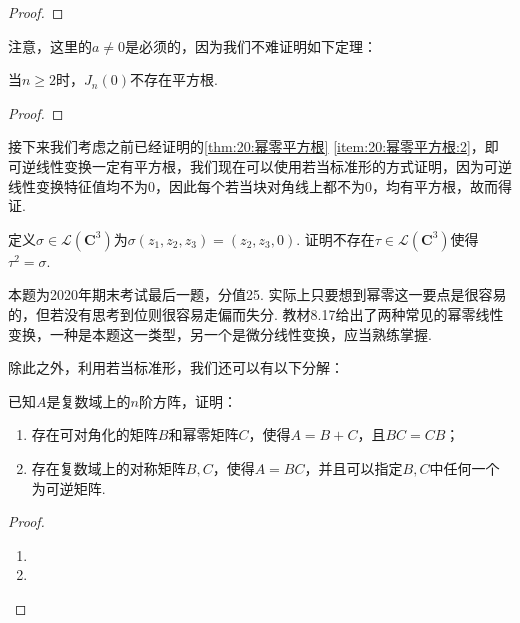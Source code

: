 \begin{proof}

\end{proof}

注意，这里的$a\neq 0$是必须的，因为我们不难证明如下定理：
\begin{theorem}
    当$n\geqslant 2$时，$J_n(0)$不存在平方根.
\end{theorem}

\begin{proof}

\end{proof}

接下来我们考虑之前已经证明的\autoref{thm:20:幂零平方根} \ref*{item:20:幂零平方根:2}，即可逆线性变换一定有平方根，我们现在可以使用若当标准形的方式证明，因为可逆线性变换特征值均不为0，因此每个若当块对角线上都不为0，均有平方根，故而得证.
\begin{example}
    定义$\sigma\in \mathcal{L}(\mathbf{C}^3)$为$\sigma(z_1,z_2,z_3)=(z_2,z_3,0)$. 证明不存在$\tau\in \mathcal{L}(\mathbf{C}^3)$使得$\tau^2=\sigma$.
\end{example}

\begin{solution}

\end{solution}

本题为2020年期末考试最后一题，分值25. 实际上只要想到幂零这一要点是很容易的，但若没有思考到位则很容易走偏而失分. 教材8.17给出了两种常见的幂零线性变换，一种是本题这一类型，另一个是微分线性变换，应当熟练掌握.

除此之外，利用若当标准形，我们还可以有以下分解：
\begin{example}
    已知$A$是复数域上的$n$阶方阵，证明：
    \begin{enumerate}
        \item 存在可对角化的矩阵$B$和幂零矩阵$C$，使得$A=B+C$，且$BC=CB$；

        \item 存在复数域上的对称矩阵$B,C$，使得$A=BC$，并且可以指定$B,C$中任何一个为可逆矩阵.
    \end{enumerate}
\end{example}

\begin{proof}
    \begin{enumerate}
        \item

        \item
    \end{enumerate}
\end{proof}

